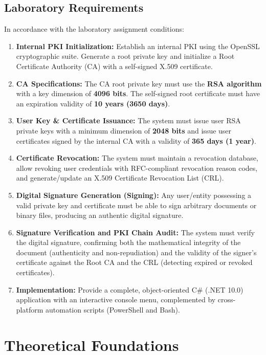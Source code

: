 \documentclass[12pt,a4paper]{article}
\begin{document}
\subsection{Laboratory Requirements}
In accordance with the laboratory assignment conditions:
\begin{enumerate}
    \item \textbf{Internal PKI Initialization:} Establish an internal PKI using the OpenSSL cryptographic suite. Generate a root private key and initialize a Root Certificate Authority (CA) with a self-signed X.509 certificate.
    \item \textbf{CA Specifications:} The CA root private key must use the \textbf{RSA algorithm} with a key dimension of \textbf{4096 bits}. The self-signed root certificate must have an expiration validity of \textbf{10 years (3650 days)}.
    \item \textbf{User Key \& Certificate Issuance:} The system must issue user RSA private keys with a minimum dimension of \textbf{2048 bits} and issue user certificates signed by the internal CA with a validity of \textbf{365 days (1 year)}.
    \item \textbf{Certificate Revocation:} The system must maintain a revocation database, allow revoking user credentials with RFC-compliant revocation reason codes, and generate/update an X.509 Certificate Revocation List (CRL).
    \item \textbf{Digital Signature Generation (Signing):} Any user/entity possessing a valid private key and certificate must be able to sign arbitrary documents or binary files, producing an authentic digital signature.
    \item \textbf{Signature Verification and PKI Chain Audit:} The system must verify the digital signature, confirming both the mathematical integrity of the document (authenticity and non-repudiation) and the validity of the signer's certificate against the Root CA and the CRL (detecting expired or revoked certificates).
    \item \textbf{Implementation:} Provide a complete, object-oriented C\# (.NET 10.0) application with an interactive console menu, complemented by cross-platform automation scripts (PowerShell and Bash).
\end{enumerate}

\section{Theoretical Foundations}
\end{document}

